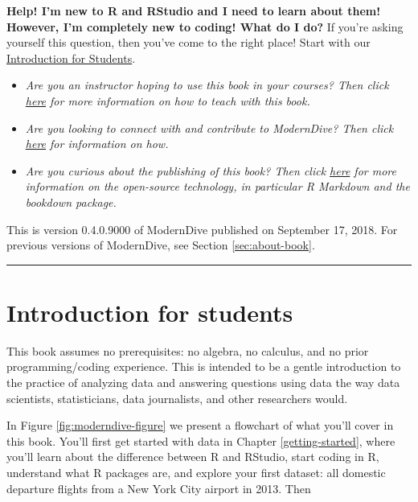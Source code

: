 \documentclass[12pt,]{krantz}
\providecommand{\tightlist}{%
  \setlength{\itemsep}{0pt}\setlength{\parskip}{0pt}}
\begin{document}
\textbf{Help! I'm new to R and RStudio and I need to learn about them!
However, I'm completely new to coding! What do I do?} If you're asking
yourself this question, then you've come to the right place! Start with
our \protect\hyperlink{sec:intro-for-students}{Introduction for
Students}.

\begin{itemize}
\tightlist
\item
  \emph{Are you an instructor hoping to use this book in your courses?
  Then click \protect\hyperlink{sec:intro-instructors}{here} for more
  information on how to teach with this book.}
\item
  \emph{Are you looking to connect with and contribute to ModernDive?
  Then click \protect\hyperlink{sec:connect-contribute}{here} for
  information on how.}
\item
  \emph{Are you curious about the publishing of this book? Then click
  \protect\hyperlink{sec:about-book}{here} for more information on the
  open-source technology, in particular R Markdown and the bookdown
  package.}
\end{itemize}

This is version 0.4.0.9000 of ModernDive published on September 17,
2018. For previous versions of ModernDive, see Section
\ref{sec:about-book}.

\begin{center}\rule{0.5\linewidth}{\linethickness}\end{center}

\hypertarget{sec:intro-for-students}{\section{Introduction for
students}\label{sec:intro-for-students}}

This book assumes no prerequisites: no algebra, no calculus, and no
prior programming/coding experience. This is intended to be a gentle
introduction to the practice of analyzing data and answering questions
using data the way data scientists, statisticians, data journalists, and
other researchers would.

In Figure \ref{fig:moderndive-figure} we present a flowchart of what
you'll cover in this book. You'll first get started with data in Chapter
\ref{getting-started}, where you'll learn about the difference between R
and RStudio, start coding in R, understand what R packages are, and
explore your first dataset: all domestic departure flights from a New
York City airport in 2013. Then
\end{document}
